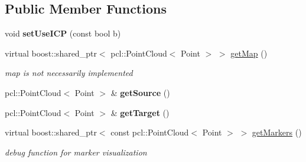 \subsection*{Public Member Functions}
\begin{DoxyCompactItemize}
\item 
\hypertarget{classRegistration__Infobased_a8736c7e147dfe0e1970745946c84572e}{
void {\bfseries setUseICP} (const bool b)}
\label{classRegistration__Infobased_a8736c7e147dfe0e1970745946c84572e}

\item 
\hypertarget{classRegistration__Infobased_a5780a16f8e3117f2f0fcba6689daec04}{
virtual boost::shared\_\-ptr$<$ pcl::PointCloud$<$ Point $>$ $>$ \hyperlink{classRegistration__Infobased_a5780a16f8e3117f2f0fcba6689daec04}{getMap} ()}
\label{classRegistration__Infobased_a5780a16f8e3117f2f0fcba6689daec04}

\begin{DoxyCompactList}\small\item\em map is not necessarily implemented \item\end{DoxyCompactList}\item 
\hypertarget{classRegistration__Infobased_ae08c19be51f80cb68fa6de0dca888a88}{
pcl::PointCloud$<$ Point $>$ \& {\bfseries getSource} ()}
\label{classRegistration__Infobased_ae08c19be51f80cb68fa6de0dca888a88}

\item 
\hypertarget{classRegistration__Infobased_a22635c046c5678769d14fcb7356a347f}{
pcl::PointCloud$<$ Point $>$ \& {\bfseries getTarget} ()}
\label{classRegistration__Infobased_a22635c046c5678769d14fcb7356a347f}

\item 
\hypertarget{classRegistration__Infobased_a130f9051bbfeda57d765e919ea8870e0}{
virtual boost::shared\_\-ptr$<$ const pcl::PointCloud$<$ Point $>$ $>$ \hyperlink{classRegistration__Infobased_a130f9051bbfeda57d765e919ea8870e0}{getMarkers} ()}
\label{classRegistration__Infobased_a130f9051bbfeda57d765e919ea8870e0}

\begin{DoxyCompactList}\small\item\em debug function for marker visualization \item\end{DoxyCompactList}\end{DoxyCompactItemize}
